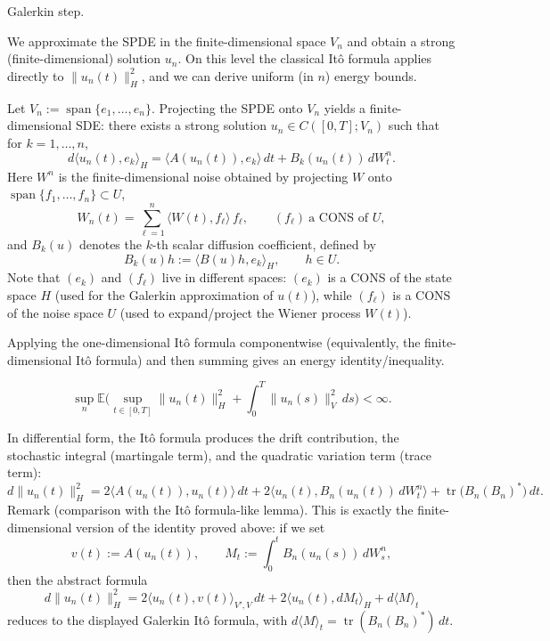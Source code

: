 \documentclass[11pt]{article}
\theoremstyle{definition}
\theoremstyle{remark}
\DeclareMathOperator{\tr}{tr}
\begin{document}
\medskip
\noindent
Galerkin step.

\medskip
\noindent
We approximate the SPDE in the finite-dimensional space \(V_{n}\) and obtain a strong (finite-dimensional) solution \(u_{n}\).
On this level the classical It\^o formula applies directly to \(\|u_{n}(t)\|_{H}^{2}\), and we can derive uniform (in \(n\)) energy bounds.

Let \(V_n:=\operatorname{span}\{e_1,\dots,e_n\}\). Projecting the SPDE onto \(V_n\) yields a finite-dimensional SDE: there exists a strong solution \(u_n\in C([0,T];V_n)\) such that for \(k=1,\dots,n\),
\[
d\langle u_{n}(t),e_{k}\rangle_{H}
=\langle A(u_{n}(t)),e_{k}\rangle\,dt
+B_{k}(u_{n}(t))\,dW_{t}^{n}.
\]
Here \(W^n\) is the finite-dimensional noise obtained by projecting \(W\) onto \(\operatorname{span}\{f_1,\dots,f_n\}\subset U\),
\[
W_{n}(t)=\sum_{\ell=1}^{n}\langle W(t),f_{\ell}\rangle\, f_{\ell},
\qquad (f_{\ell})\ \text{a CONS of }U,
\]
and \(B_k(u)\) denotes the \(k\)-th scalar diffusion coefficient, defined by
\[
B_{k}(u)h:=\langle B(u)h,e_{k}\rangle_{H},
\qquad h\in U.
\]
Note that \((e_k)\) and \((f_\ell)\) live in different spaces: \((e_k)\) is a CONS of the state space \(H\) (used for the Galerkin approximation of \(u(t)\)), while \((f_\ell)\) is a CONS of the noise space \(U\) (used to expand/project the Wiener process \(W(t)\)).

\medskip
\noindent
Applying the one-dimensional It\^o formula componentwise (equivalently, the finite-dimensional It\^o formula) and then summing gives an energy identity/inequality.

\[
\sup_{n}\mathbb{E}\Big(\sup_{t\in[0,T]}\|u_{n}(t)\|_{H}^{2}+\int_{0}^{T}\|u_{n}(s)\|_{V}^{2}\,ds\Big)<\infty.
\]

\medskip
\noindent
In differential form, the It\^o formula produces the drift contribution, the stochastic integral (martingale term), and the quadratic variation term (trace term):
\[
d\|u_{n}(t)\|_{H}^{2}
=2\langle A(u_{n}(t)),u_{n}(t)\rangle\,dt
+2\langle u_{n}(t),B_{n}(u_{n}(t))\,dW_{t}^{n}\rangle
+\tr\big(B_{n}(B_{n})^{*}\big)\,dt.
\]
\noindent
Remark (comparison with the It\^o formula-like lemma).
This is exactly the finite-dimensional version of the identity proved above: if we set
\[
v(t):=A(u_n(t)),
\qquad
M_t:=\int_0^t B_n(u_n(s))\,dW_s^n,
\]
then the abstract formula
\[
d\|u_n(t)\|_H^2=2\langle u_n(t),v(t)\rangle_{V',V}\,dt+2\langle u_n(t),dM_t\rangle_H+d\langle M\rangle_t
\]
reduces to the displayed Galerkin It\^o formula, with \(d\langle M\rangle_t=\tr(B_n(B_n)^*)\,dt\).
\end{document}
